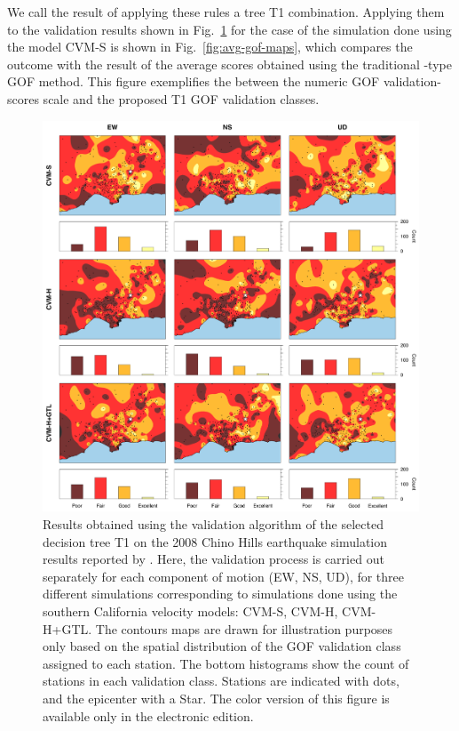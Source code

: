 We call the result of applying these rules a tree T1 combination. Applying them to the validation results shown in Fig.~\ref{fig:res-gof-maps} for the case of the simulation done using the model CVM-S is shown in Fig.~\ref{fig:avg-gof-maps}, which compares the outcome with the result of the average scores obtained using the traditional \citet{Anderson_2004_Proc}-type GOF method. This figure exemplifies the  between the numeric GOF validation-scores scale and the proposed T1 GOF validation classes. 

\begin{figure}%
	\centering
	\includegraphics[width=\textwidth]{figures/pdf/figure-10}
	\caption{Results obtained using the validation algorithm of the selected decision tree T1 on the 2008 Chino Hills earthquake simulation results reported by \citet{Taborda_2014_BSSA}. Here, the validation process is carried out separately for each component of motion (EW, NS, UD), for three different simulations corresponding to simulations done using the southern California velocity models: CVM-S, CVM-H, CVM-H+GTL. The contours maps are drawn for illustration purposes only based on the spatial distribution of the GOF validation class assigned to each station. The bottom histograms show the count of stations in each validation class. Stations are indicated with dots, and the epicenter with a Star. The color version of this figure is available only in the electronic edition.}
	\label{fig:res-gof-maps}
\end{figure}

